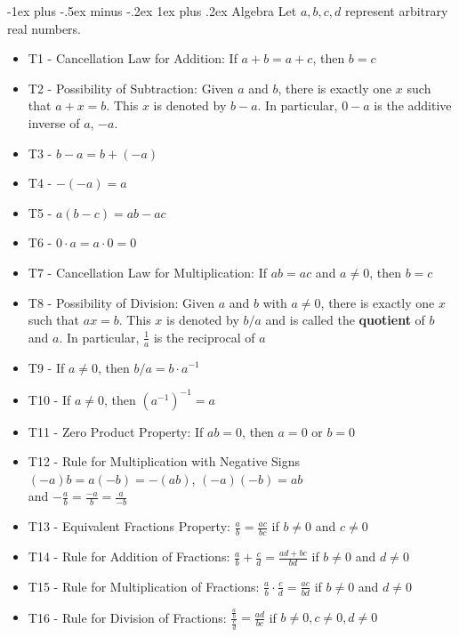 \documentclass[10pt, landscape]{article}
\makeatletter
\renewcommand{\subsubsection}{\@startsection{subsubsection}{3}{0mm}%
                                {-1ex plus -.5ex minus -.2ex}%
                                {1ex plus .2ex}%
                                {\normalfont\small\bfseries}}%
\renewcommand{\bf}[1]{\textbf{#1}}
\makeatother
\begin{document}
\begin{multicols}{3}
    \subsubsection{Algebra}
    Let $a, b, c, d$ represent arbitrary real numbers.
    \begin{itemize}
        \item T1 - Cancellation Law for Addition: If $a + b = a + c$, then $b = c$
        \item T2 - Possibility of Subtraction: Given $a$ and $b$, there is exactly one $x$ such that
        $a + x = b$. This $x$ is denoted by $b - a$. In particular, $0 - a$ is the additive inverse of $a$, $-a$.
        \item T3 - $b - a = b + (-a)$
        \item T4 - $-(-a) = a$
        \item T5 - $a(b-c) = ab - ac$
        \item T6 - $0 \cdot a = a \cdot 0 = 0$
        \item T7 - Cancellation Law for Multiplication: If $ab = ac$ and $a \neq 0$, then $b = c$
        \item T8 - Possibility of Division: Given $a$ and $b$ with $a \neq 0$, there is exactly one $x$
        such that $ax = b$. This $x$ is denoted by $b / a$ and is called the \bf{quotient} of $b$ and $a$.
        In particular, $\frac{1}{a}$ is the reciprocal of $a$
        \item T9 - If $a \neq 0$, then $b / a = b \cdot a^{-1}$
        \item T10 - If $a \neq 0$, then $(a^{-1})^{-1} = a$
        \item T11 - Zero Product Property: If $ab = 0$, then $a = 0$ or $b = 0$
        \item T12 - Rule for Multiplication with Negative Signs
        \\ $(-a)b = a(-b) = -(ab)$, $(-a)(-b)=ab$
        \\ and $-\frac{a}{b} = \frac{-a}{b} = \frac{a}{-b}$
        \item T13 - Equivalent Fractions Property: $\frac{a}{b} = \frac{ac}{bc}$ if $b \neq 0$ and $c \neq 0$
        \item T14 - Rule for Addition of Fractions: $\frac{a}{b} + \frac{c}{d} = \frac{ad + bc}{bd}$ if $b \neq 0$ and $d \neq 0$
        \item T15 - Rule for Multiplication of Fractions: $\frac{a}{b} \cdot \frac{c}{d} = \frac{ac}{bd}$ if $b \neq 0$ and $d \neq 0$
        \item T16 - Rule for Division of Fractions: $\frac{\frac{a}{b}}{\frac{c}{d}} = \frac{ad}{bc}$ if $b \neq 0, c \neq 0, d \neq 0$
    \end{itemize}


\end{multicols}
\end{document}
